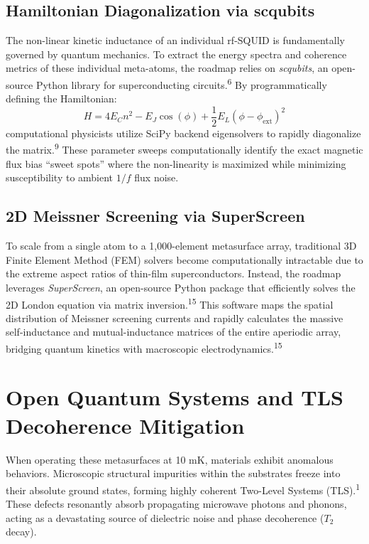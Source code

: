 \documentclass[11pt, a4paper]{article}
\begin{document}
\subsection{Hamiltonian Diagonalization via scqubits}
The non-linear kinetic inductance of an individual rf-SQUID is fundamentally governed by quantum mechanics. To extract the energy spectra and coherence metrics of these individual meta-atoms, the roadmap relies on \textit{scqubits}, an open-source Python library for superconducting circuits.\textsuperscript{6} By programmatically defining the Hamiltonian:
\begin{equation}
H = 4E_C n^2 - E_J \cos(\phi) + \frac{1}{2} E_L(\phi - \phi_{\text{ext}})^2
\end{equation}
computational physicists utilize SciPy backend eigensolvers to rapidly diagonalize the matrix.\textsuperscript{9} These parameter sweeps computationally identify the exact magnetic flux bias ``sweet spots'' where the non-linearity is maximized while minimizing susceptibility to ambient $1/f$ flux noise.

\subsection{2D Meissner Screening via SuperScreen}
To scale from a single atom to a 1,000-element metasurface array, traditional 3D Finite Element Method (FEM) solvers become computationally intractable due to the extreme aspect ratios of thin-film superconductors. Instead, the roadmap leverages \textit{SuperScreen}, an open-source Python package that efficiently solves the 2D London equation via matrix inversion.\textsuperscript{15} This software maps the spatial distribution of Meissner screening currents and rapidly calculates the massive self-inductance and mutual-inductance matrices of the entire aperiodic array, bridging quantum kinetics with macroscopic electrodynamics.\textsuperscript{15}

\section{Open Quantum Systems and TLS Decoherence Mitigation}

When operating these metasurfaces at 10 mK, materials exhibit anomalous behaviors. Microscopic structural impurities within the substrates freeze into their absolute ground states, forming highly coherent Two-Level Systems (TLS).\textsuperscript{1} These defects resonantly absorb propagating microwave photons and phonons, acting as a devastating source of dielectric noise and phase decoherence ($T_2$ decay).
\end{document}
